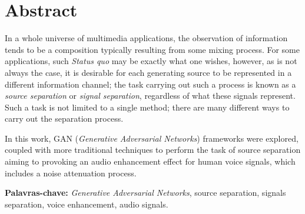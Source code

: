 \chapter*{Abstract}

In a whole universe of multimedia applications, the observation of information tends to be a composition typically resulting from some mixing process. For some applications, such \textit{Status quo} may be exactly what one wishes, however, as is not always the case, it is desirable for each generating source to be represented in a different information channel; the task carrying out such a process is known as a \textit{source separation} or \textit{signal separation}, regardless of what these signals represent. Such a task is not limited to a single method; there are many different ways to carry out the separation process.

In this work, GAN (\textit{Generative Adversarial Networks}) frameworks were explored, coupled with more traditional techniques to perform the task of source separation aiming to provoking an audio enhancement effect for human voice signals, which includes a noise attenuation process.

\vspace{2.0cm}

\noindent \textbf{Palavras-chave:} \hspace{1.0cm} \textit{Generative Adversarial Networks}, source separation, signals separation, voice enhancement, audio signals.